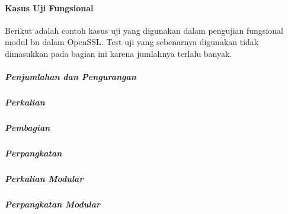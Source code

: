 \clearpage
\paragraph{Kasus Uji Fungsional} \label{sec:functional_testcase}

Berikut adalah contoh kasus uji yang digunakan dalam pengujian fungsional modul bn dalam OpenSSL. Test uji yang sebenarnya digunakan tidak dimasukkan pada bagian ini karena jumlahnya terlalu banyak.

\subparagraph{Penjumlahan dan Pengurangan}

\subparagraph{Perkalian}

\subparagraph{Pembagian}

\subparagraph{Perpangkatan}
%
\subparagraph{Perkalian Modular}
%
\subparagraph{Perpangkatan Modular}
